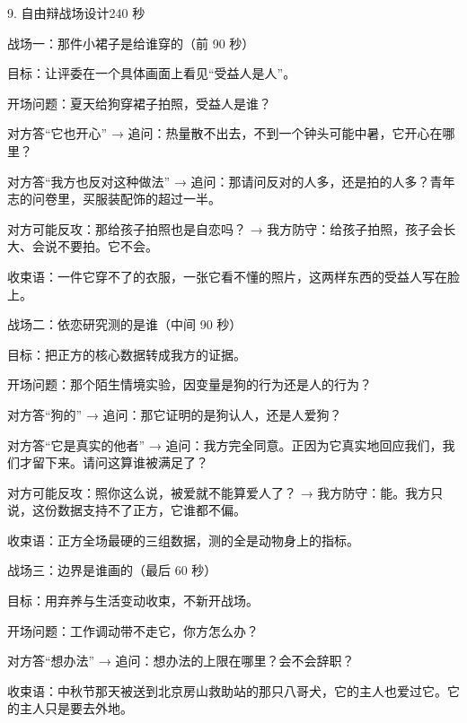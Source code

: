 \documentclass[script,con]{debate}
\begin{document}
\begin{stage}{9. 自由辩战场设计}{240 秒}
\begin{battleground}{战场一：那件小裙子是给谁穿的（前 90 秒）}
\begin{bullets}
\item 目标：让评委在一个具体画面上看见“受益人是人”。
\item 开场问题：夏天给狗穿裙子拍照，受益人是谁？
\item 对方答“它也开心” → 追问：热量散不出去，不到一个钟头可能中暑，它开心在哪里？
\item 对方答“我方也反对这种做法” → 追问：那请问反对的人多，还是拍的人多？青年志的问卷里，买服装配饰的超过一半。
\item 对方可能反攻：那给孩子拍照也是自恋吗？ → 我方防守：给孩子拍照，孩子会长大、会说不要拍。它不会。
\item 收束语：一件它穿不了的衣服，一张它看不懂的照片，这两样东西的受益人写在脸上。
\end{bullets}
\end{battleground}
\begin{battleground}{战场二：依恋研究测的是谁（中间 90 秒）}
\begin{bullets}
\item 目标：把正方的核心数据转成我方的证据。
\item 开场问题：那个陌生情境实验，因变量是狗的行为还是人的行为？
\item 对方答“狗的” → 追问：那它证明的是狗认人，还是人爱狗？
\item 对方答“它是真实的他者” → 追问：我方完全同意。正因为它真实地回应我们，我们才留下来。请问这算谁被满足了？
\item 对方可能反攻：照你这么说，被爱就不能算爱人了？ → 我方防守：能。我方只说，这份数据支持不了正方，它谁都不偏。
\item 收束语：正方全场最硬的三组数据，测的全是动物身上的指标。
\end{bullets}
\end{battleground}
\begin{battleground}{战场三：边界是谁画的（最后 60 秒）}
\begin{bullets}
\item 目标：用弃养与生活变动收束，不新开战场。
\item 开场问题：工作调动带不走它，你方怎么办？
\item 对方答“想办法” → 追问：想办法的上限在哪里？会不会辞职？
\item 收束语：中秋节那天被送到北京房山救助站的那只八哥犬，它的主人也爱过它。它的主人只是要去外地。

\end{bullets}
\end{battleground}
\end{stage}
\end{document}

